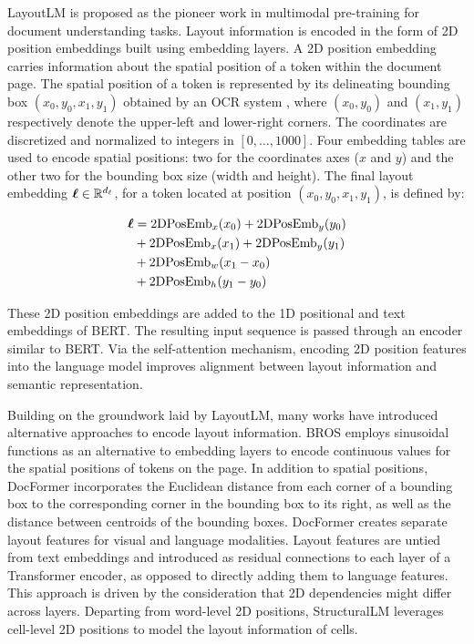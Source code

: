 LayoutLM \citep{xu2020layoutlm} is proposed as the pioneer work in multimodal pre-training for document understanding tasks. Layout information is encoded in the form of 2D position embeddings built using embedding layers. A 2D position embedding carries information about the spatial position of a token within the document page. The spatial position of a token is represented by its delineating bounding box $(x_0, y_0, x_1, y_1)$ obtained by an \ac{OCR} system \citep{kay2007tesseract}, where $(x_0, y_0)$ and $(x_1, y_1)$ respectively denote the upper-left and lower-right corners. The coordinates are discretized and normalized to integers in $[0, \ldots, 1000]$. Four embedding tables are used to encode spatial positions: two for the coordinates axes ($x$ and $y$) and the other two for the bounding box size (width and height). The final layout embedding $\boldsymbol{\ell} \in \mathbb{R}^{d_{\ell}}$, for a token located at position $(x_0, y_0, x_1, y_1)$, is defined by:

\begin{equation}
\begin{split}
    \boldsymbol{\ell} & = \text{2DPosEmb}_x(x_0) + \text{2DPosEmb}_y(y_0) \\
    & + \text{2DPosEmb}_x(x_1) + \text{2DPosEmb}_y(y_1) \\
    & + \text{2DPosEmb}_w(x_1 - x_0) \\
    & + \text{2DPosEmb}_h(y_1 - y_0) \\
\end{split}
\end{equation}

\noindent These 2D position embeddings are added to the 1D positional and text embeddings of \ac{BERT}. The resulting input sequence is passed through an encoder similar to \ac{BERT}. Via the self-attention mechanism, encoding 2D position features into the language model improves alignment between layout information and semantic representation. 

Building on the groundwork laid by LayoutLM, many works have introduced alternative approaches to encode layout information. BROS \citep{hong2020bros} employs sinusoidal functions as an alternative to embedding layers to encode continuous values for the spatial positions of tokens on the page. In addition to spatial positions, DocFormer \citep{appalaraju2021docformer} incorporates the Euclidean distance from each corner of a bounding box to the corresponding corner in the bounding box to its right, as well as the distance between centroids of the bounding boxes. DocFormer creates separate layout features for visual and language modalities. Layout features are untied from text embeddings and introduced as residual connections to each layer of a Transformer encoder, as opposed to directly adding them to language features. This approach is driven by the consideration that 2D dependencies might differ across layers. Departing from word-level 2D positions, StructuralLM \citep{li2021structurallm} leverages cell-level 2D positions to model the layout information of cells. 

